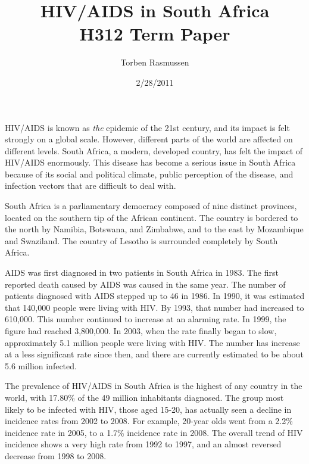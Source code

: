 \documentclass[12pt]{report}
\title{HIV/AIDS in South Africa \\ \normalsize{H312 Term Paper}}
\author{Torben Rasmussen}
\date{2/28/2011}
\begin{document}
\maketitle

HIV/AIDS is known as \emph{the} epidemic of the 21st century, and its impact is felt strongly on a global scale.
However, different parts of the world are affected on different levels.  
South Africa, a modern, developed country, has felt the impact of HIV/AIDS enormously.
This disease has become a serious issue in South Africa because of its social and political climate, public perception of the disease, and infection vectors that are difficult to deal with. 

South Africa is a parliamentary democracy composed of nine distinct provinces, located on the southern tip of the African continent.
The country is bordered to the north by Namibia, Botswana, and Zimbabwe, and to the east by Mozambique and Swaziland.  
The country of Lesotho is surrounded completely by South Africa\cite{wiki-sa}.

AIDS was first diagnosed in two patients in South Africa in 1983.  
The first reported death caused by AIDS was caused in the same year.
The number of patients diagnosed with AIDS stepped up to 46 in 1986.
In 1990, it was estimated that 140,000 people were living with HIV.
By 1993, that number had increased to 610,000.
This number continued to increase at an alarming rate.  
In 1999, the figure had reached 3,800,000.
In 2003, when the rate finally began to slow, approximately 5.1 million people were living with HIV.
The number has increase at a less significant rate since then, and there are currently estimated to be about 5.6 million infected.

The prevalence of HIV/AIDS in South Africa is the highest of any country in the world, with 17.80\% of the 49 million inhabitants diagnosed\cite{cia}.
The group most likely to be infected with HIV, those aged 15-20, has actually seen a decline in incidence rates from 2002 to 2008\cite{shisana}.
For example, 20-year olds went from a 2.2\% incidence rate in 2005, to a 1.7\% incidence rate in 2008.
The overall trend of HIV incidence shows a very high rate from 1992 to 1997, and an almost reversed decrease from 1998 to 2008\cite{gap-incidence}.
\end{document}
